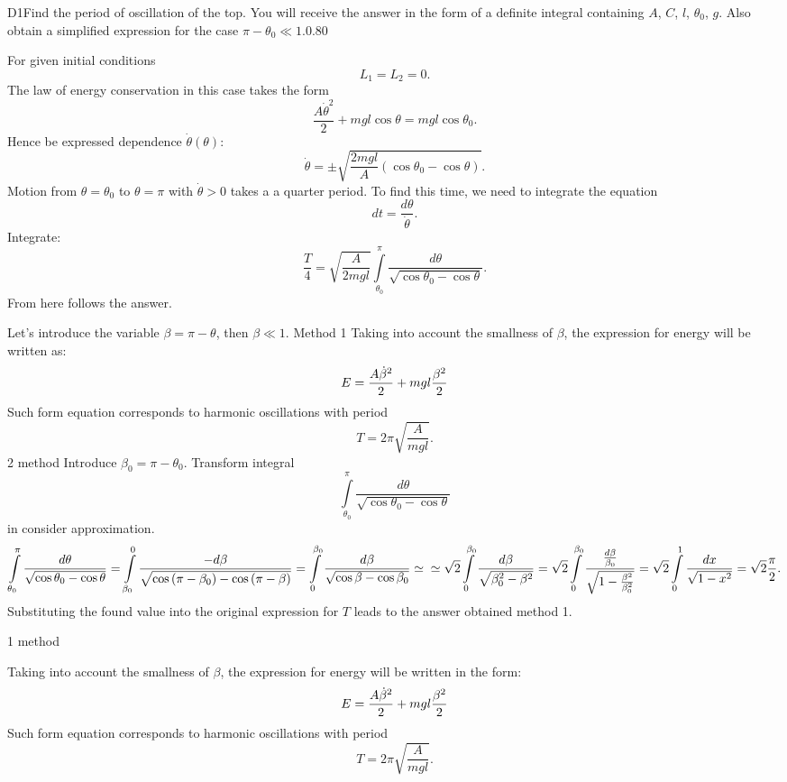 \documentclass[11pt,a4paper]{article}
\begin{document}
\begin{solcard}{D1}{Find the period of oscillation of the top. You will receive the answer in the form of a definite integral containing $A$, $C$, $l$, $\theta_0$, $g$. Also obtain a simplified expression for the case $\pi - \theta_0 \ll 1$.}{0.80}

For given initial conditions $$L_1 = L_2 = 0.$$ The law of energy conservation in this case takes the form $$\frac{A\dot{\theta}^2}{2} + mgl\cos{\theta} = mgl\cos{\theta_0}.$$ Hence be expressed dependence $\dot\theta(\theta)$: $$\dot{\theta} = \pm \sqrt{\frac{2mgl}{A}(\cos{\theta_0} - \cos{\theta})}.$$ Motion from $\theta = \theta_0$ to $\theta = \pi$ with $\dot\theta > 0$ takes a a quarter period. To find this time, we need to integrate the equation $$dt = \frac{d\theta}{\dot\theta}.$$Integrate: $$\frac{T}{4} = \sqrt{\frac{A}{2mgl}}\int\limits_{\theta_0}^{\pi}{\frac{d\theta}{\sqrt{\cos{\theta_0} - \cos{\theta}}}}.$$From here follows the answer.


Let's introduce the variable $\beta = \pi - \theta$, then $\beta \ll 1$. Method 1 Taking into account the smallness of $\beta$, the expression for energy will be written as: $$ E = \frac{A\dot{\beta}^2}{2} + mgl\frac{\beta^2}{2}\\ $$ Such form equation corresponds to harmonic oscillations with period $$ T = 2\pi \sqrt{\frac{A}{mgl}}. $$ 2 method Introduce $\beta_0 = \pi - \theta_0$. Transform integral $$\int\limits_{\theta_0}^{\pi}{\frac{d\theta}{\sqrt{\cos{\theta_0} - \cos{\theta}}}}$$ in consider approximation. $$\int\limits_{\theta_0}^{\pi}{\frac{d\theta}{\sqrt{\cos{\theta_0} - \cos{\theta}}}} = \int\limits_{\beta_0}^{0}{\frac{-d\beta}{\sqrt{\cos{(\pi - \beta_0)} - \cos{(\pi - \beta)}}}} = \int\limits_{0}^{\beta_0}{\frac{d\beta}{\sqrt{\cos \beta - \cos \beta_0}}} \simeq \\ \simeq \sqrt{2} \int\limits_{0}^{\beta_0}{\frac{d\beta}{\sqrt{\beta_0^2 - \beta^2}}} = \sqrt{2} \int\limits_{0}^{\beta_0}{\frac{\frac{d\beta}{\beta_0}}{\sqrt{1 - \frac{\beta^2}{\beta_0^2}}}} = \sqrt{2} \int\limits_{0}^{1}{\frac{dx}{\sqrt{1 -x^2}}} = \sqrt{2} \frac{\pi}{2}.$$ Substituting the found value into the original expression for $T$ leads to the answer obtained method 1.


1 method


Taking into account the smallness of $\beta$, the expression for energy will be written in the form: $$ E = \frac{A\dot{\beta}^2}{2} + mgl\frac{\beta^2}{2}\\ $$ Such form equation corresponds to harmonic oscillations with period $$ T = 2\pi \sqrt{\frac{A}{mgl}}. $$



\end{solcard}
\end{document}
